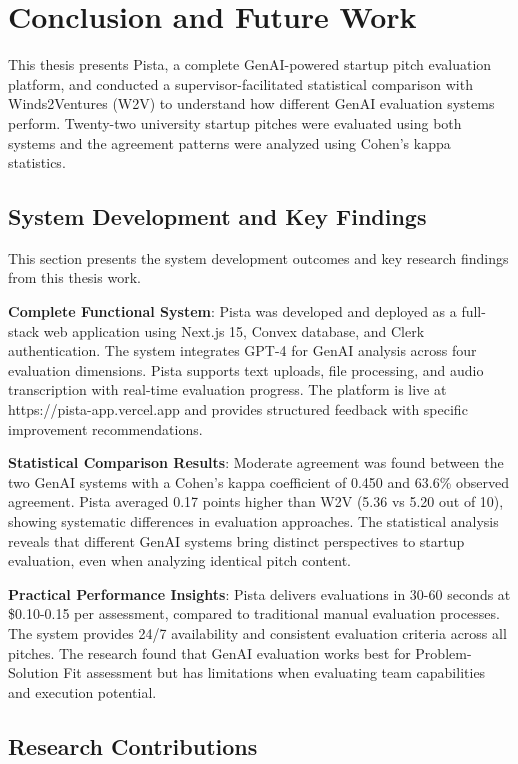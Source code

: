 \chapter{Conclusion and Future Work}
\label{ch:conclusion}

This thesis presents Pista, a complete GenAI-powered startup pitch evaluation platform, and conducted a supervisor-facilitated statistical comparison with Winds2Ventures (W2V) to understand how different GenAI evaluation systems perform. Twenty-two university startup pitches were evaluated using both systems and the agreement patterns were analyzed using Cohen's kappa statistics.

\section{System Development and Key Findings}
\label{sec:accomplishments}

This section presents the system development outcomes and key research findings from this thesis work.

\textbf{Complete Functional System}: Pista was developed and deployed as a full-stack web application using Next.js 15, Convex database, and Clerk authentication. The system integrates GPT-4 for GenAI analysis across four evaluation dimensions. Pista supports text uploads, file processing, and audio transcription with real-time evaluation progress. The platform is live at https://pista-app.vercel.app and provides structured feedback with specific improvement recommendations.

\textbf{Statistical Comparison Results}: Moderate agreement was found between the two GenAI systems with a Cohen's kappa coefficient of 0.450 and 63.6\% observed agreement. Pista averaged 0.17 points higher than W2V (5.36 vs 5.20 out of 10), showing systematic differences in evaluation approaches. The statistical analysis reveals that different GenAI systems bring distinct perspectives to startup evaluation, even when analyzing identical pitch content.

\textbf{Practical Performance Insights}: Pista delivers evaluations in 30-60 seconds at \$0.10-0.15 per assessment, compared to traditional manual evaluation processes. The system provides 24/7 availability and consistent evaluation criteria across all pitches. The research found that GenAI evaluation works best for Problem-Solution Fit assessment but has limitations when evaluating team capabilities and execution potential.

\section{Research Contributions}
\label{sec:contributions}

